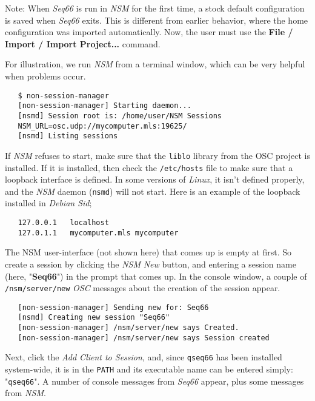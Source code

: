    Note: When \textsl{Seq66} is run in \textsl{NSM} for the first time,
   a stock default configuration is saved when
   \textsl{Seq66} exits.
   This is different from earlier behavior, where the home configuration was
   imported automatically.
   Now, the user must use the
   \textbf{File / Import / Import Project...}
   command.

   For illustration, we run \textsl{NSM} from a terminal window, which can be
   very helpful when problems occur.

\begin{verbatim}
   $ non-session-manager
   [non-session-manager] Starting daemon...
   [nsmd] Session root is: /home/user/NSM Sessions
   NSM_URL=osc.udp://mycomputer.mls:19625/
   [nsmd] Listing sessions
\end{verbatim}

   If \textsl{NSM} refuses to start, make sure that the \texttt{liblo} library
   from the OSC project is installed.
   If it is installed, then check the
   \texttt{/etc/hosts} file to make sure that a loopback interface is
   defined. In some versions of \textsl{Linux}, it isn't defined properly,
   and the \textsl{NSM} daemon (\texttt{nsmd}) will not start.
   Here is an example of the loopback installed in \textsl{Debian Sid};

\begin{verbatim}
   127.0.0.1   localhost
   127.0.1.1   mycomputer.mls mycomputer
\end{verbatim}

   The NSM user-interface (not shown here) that comes up is empty at first.
   So create a session by clicking the \textsl{NSM}
   \textsl{New} button, and entering a session name
   (here, "\textbf{Seq66}") in the
   prompt that comes up.  In the console window, a couple of 
   \texttt{/nsm/server/new} \textsl{OSC} messages
   about the creation of the session appear.

\begin{verbatim}
   [non-session-manager] Sending new for: Seq66
   [nsmd] Creating new session "Seq66"
   [non-session-manager] /nsm/server/new says Created.
   [non-session-manager] /nsm/server/new says Session created
\end{verbatim}

   Next, click the \textsl{Add Client to Session}, and, since
   \texttt{qseq66} has been installed system-wide, it is in the \texttt{PATH}
   and its executable name can be entered simply: "\texttt{qseq66}".
   A number of console messages from
   \textsl{Seq66} appear, plus some messages from \textsl{NSM}.

